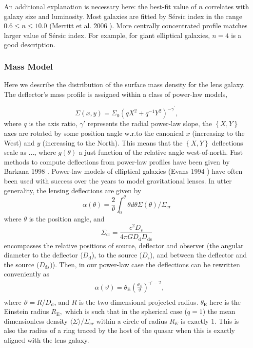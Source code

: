 \documentclass[a4paper,11pt]{article}
\begin{document}
An additional explanation is necessary here: the best-fit value of $n$ correlates with galaxy size and luminosity. Most galaxies are fitted by S\'ersic index in the range $0.6 \le n \le 10.0$ (Merritt et al. 2006 \cite{2006AJ....132.2685M}). More centrally concentrated profile matches larger value of S\'ersic index. For example, for giant elliptical galaxies, $n = 4$ is a good description. 


\subsubsection{Mass Model}

Here we describe the distribution of the surface mass density for the lens galaxy. The deflector's mass profile is assigned within a class of power-law models,

\begin{equation}
\Sigma(x,y)=\Sigma_{0}(q X^{2}+q^{-1}Y^{2})^{-\gamma^{\prime}},
\end{equation}
where $q$ is the axis ratio, $\gamma'$ represents the radial power-law slope, the $\left\{X,Y\right\}$ axes are rotated by some position angle w.r.to the canonical $x$ (increasing to the West) and $y$ (increasing to the North). This means that the $\left\{X,Y\right\}$ deflections scale as ..., where $g(\theta)$ a just function of the relative angle west-of-north. Fast methods to compute deflections from power-law profiles have been given by Barkana 1998 \cite{1998ApJ...502..531B}. Power-law models of elliptical galaxies (Evans 1994 \cite{1994MNRAS.267..333E}) have often been used with success over the years to model gravitational lenses. In utter generality, the lensing deflections are given by
%
\begin{equation}
\alpha(\theta) = \frac{2}{\theta} \int_{0}^{\theta} \theta d\theta \Sigma (\theta) /\Sigma_{\mathrm{cr}}
\end{equation}
%
where $\theta$ is the position angle, and 
%
\begin{equation}
\Sigma_{\mathrm{cr}} = \frac{c^{2}D_{\mathrm{s}}}{4\pi G D_{\mathrm{d}} D_{\mathrm{ds}}}
\end{equation}
%
encompasses the relative positions of source, deflector and observer (the angular diameter to the deflector ($D_{\mathrm{d}}$), to the source ($D_{\mathrm{s}}$), and between the deflector and the source ($D_{\mathrm{ds}}$)). Then, in our power-law case the deflections can be rewritten conveniently as
%
\begin{eqnarray}
   \label{eq:Intensity}
   &\alpha(\vartheta) = \theta_{\mathrm{E}}\left(\frac{\theta_{\mathrm{E}}}{\vartheta}\right)^{\gamma'-2} ,\\  
\end{eqnarray}
%
where $\vartheta = R/D_{\mathrm{d}}$, and $R$ is the two-dimensional projected radius. $\theta_{\mathrm{E}}$ here is the Einstein radius $R_{\mathrm{E}},$ which is such that in the spherical case ($q=1$) the mean dimensionless density $\langle\Sigma\rangle/\Sigma_{cr}$ within a circle of radius $R_E$ is exactly 1. This is also the radius of a ring traced by the host of the quasar when this is exactly aligned with the lens galaxy.
\end{document}
